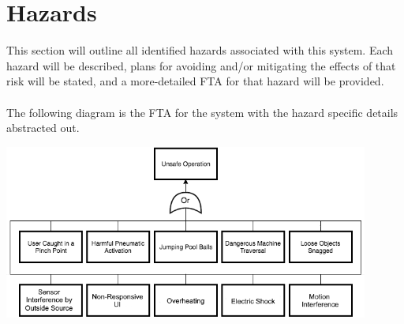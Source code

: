 \documentclass[titlepage]{article}
\begin{document}
\section{Hazards}
This section will outline all identified hazards associated with this system. Each hazard will be described, plans for avoiding and/or mitigating the effects of that risk will be stated, and a more-detailed FTA for that hazard will be provided.\\~\\
The following diagram is the FTA for the system with the hazard specific details abstracted out.\\
\begin{center}
	\includegraphics[width=0.9\textwidth]{SystemFTA.png}
\label{fig:yRailFig}
\end{center}~\\[-8mm]

\newpage
\end{document}
